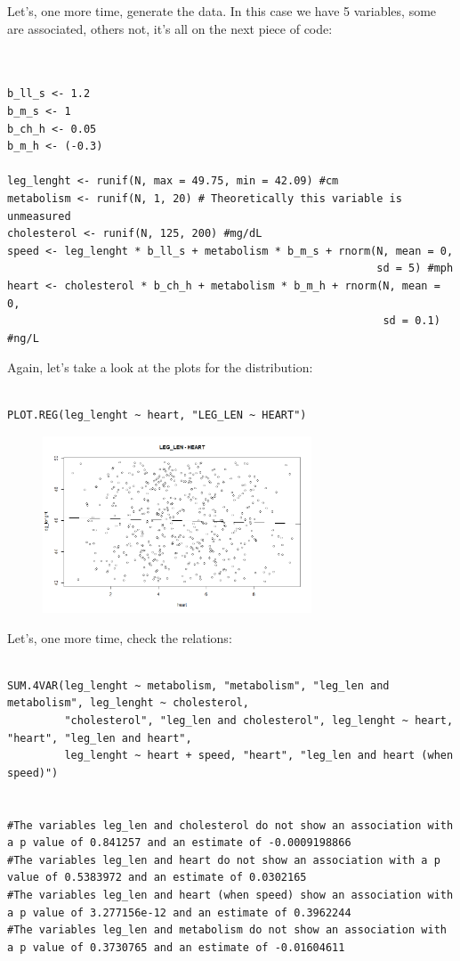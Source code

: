 \documentclass{article}
\begin{document}
Let's, one more time, generate the data. In this case we have 5 variables, some are associated, others not, it's all on the next piece of code:

\begin{lstlisting}


b_ll_s <- 1.2
b_m_s <- 1
b_ch_h <- 0.05
b_m_h <- (-0.3)

leg_lenght <- runif(N, max = 49.75, min = 42.09) #cm
metabolism <- runif(N, 1, 20) # Theoretically this variable is unmeasured
cholesterol <- runif(N, 125, 200) #mg/dL
speed <- leg_lenght * b_ll_s + metabolism * b_m_s + rnorm(N, mean = 0, 
                                                          sd = 5) #mph
heart <- cholesterol * b_ch_h + metabolism * b_m_h + rnorm(N, mean = 0, 
                                                           sd = 0.1) #ng/L

\end{lstlisting}

Again, let's take a look at the plots for the distribution:

\begin{lstlisting}

PLOT.REG(leg_lenght ~ heart, "LEG_LEN ~ HEART")

\end{lstlisting}

\begin{figure}[h]
\includegraphics[width=8cm]{PLOT_RUNNER.png}
\centering
\end{figure}



Let's, one more time, check the relations:

\begin{lstlisting}

SUM.4VAR(leg_lenght ~ metabolism, "metabolism", "leg_len and metabolism", leg_lenght ~ cholesterol,
         "cholesterol", "leg_len and cholesterol", leg_lenght ~ heart, "heart", "leg_len and heart", 
         leg_lenght ~ heart + speed, "heart", "leg_len and heart (when speed)")


#The variables leg_len and cholesterol do not show an association with a p value of 0.841257 and an estimate of -0.0009198866 
#The variables leg_len and heart do not show an association with a p value of 0.5383972 and an estimate of 0.0302165 
#The variables leg_len and heart (when speed) show an association with a p value of 3.277156e-12 and an estimate of 0.3962244 
#The variables leg_len and metabolism do not show an association with a p value of 0.3730765 and an estimate of -0.01604611 

\end{lstlisting}
\end{document}

